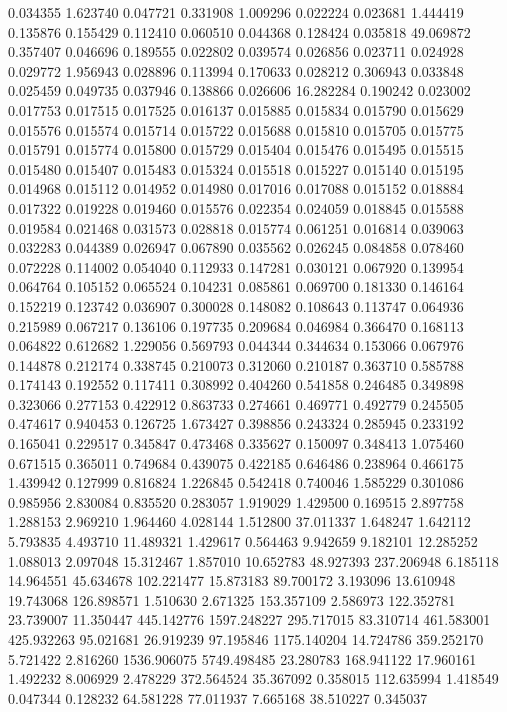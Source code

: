 0.034355
1.623740
0.047721
0.331908
1.009296
0.022224
0.023681
1.444419
0.135876
0.155429
0.112410
0.060510
0.044368
0.128424
0.035818
49.069872
0.357407
0.046696
0.189555
0.022802
0.039574
0.026856
0.023711
0.024928
0.029772
1.956943
0.028896
0.113994
0.170633
0.028212
0.306943
0.033848
0.025459
0.049735
0.037946
0.138866
0.026606
16.282284
0.190242
0.023002
0.017753
0.017515
0.017525
0.016137
0.015885
0.015834
0.015790
0.015629
0.015576
0.015574
0.015714
0.015722
0.015688
0.015810
0.015705
0.015775
0.015791
0.015774
0.015800
0.015729
0.015404
0.015476
0.015495
0.015515
0.015480
0.015407
0.015483
0.015324
0.015518
0.015227
0.015140
0.015195
0.014968
0.015112
0.014952
0.014980
0.017016
0.017088
0.015152
0.018884
0.017322
0.019228
0.019460
0.015576
0.022354
0.024059
0.018845
0.015588
0.019584
0.021468
0.031573
0.028818
0.015774
0.061251
0.016814
0.039063
0.032283
0.044389
0.026947
0.067890
0.035562
0.026245
0.084858
0.078460
0.072228
0.114002
0.054040
0.112933
0.147281
0.030121
0.067920
0.139954
0.064764
0.105152
0.065524
0.104231
0.085861
0.069700
0.181330
0.146164
0.152219
0.123742
0.036907
0.300028
0.148082
0.108643
0.113747
0.064936
0.215989
0.067217
0.136106
0.197735
0.209684
0.046984
0.366470
0.168113
0.064822
0.612682
1.229056
0.569793
0.044344
0.344634
0.153066
0.067976
0.144878
0.212174
0.338745
0.210073
0.312060
0.210187
0.363710
0.585788
0.174143
0.192552
0.117411
0.308992
0.404260
0.541858
0.246485
0.349898
0.323066
0.277153
0.422912
0.863733
0.274661
0.469771
0.492779
0.245505
0.474617
0.940453
0.126725
1.673427
0.398856
0.243324
0.285945
0.233192
0.165041
0.229517
0.345847
0.473468
0.335627
0.150097
0.348413
1.075460
0.671515
0.365011
0.749684
0.439075
0.422185
0.646486
0.238964
0.466175
1.439942
0.127999
0.816824
1.226845
0.542418
0.740046
1.585229
0.301086
0.985956
2.830084
0.835520
0.283057
1.919029
1.429500
0.169515
2.897758
1.288153
2.969210
1.964460
4.028144
1.512800
37.011337
1.648247
1.642112
5.793835
4.493710
11.489321
1.429617
0.564463
9.942659
9.182101
12.285252
1.088013
2.097048
15.312467
1.857010
10.652783
48.927393
237.206948
6.185118
14.964551
45.634678
102.221477
15.873183
89.700172
3.193096
13.610948
19.743068
126.898571
1.510630
2.671325
153.357109
2.586973
122.352781
23.739007
11.350447
445.142776
1597.248227
295.717015
83.310714
461.583001
425.932263
95.021681
26.919239
97.195846
1175.140204
14.724786
359.252170
5.721422
2.816260
1536.906075
5749.498485
23.280783
168.941122
17.960161
1.492232
8.006929
2.478229
372.564524
35.367092
0.358015
112.635994
1.418549
0.047344
0.128232
64.581228
77.011937
7.665168
38.510227
0.345037
